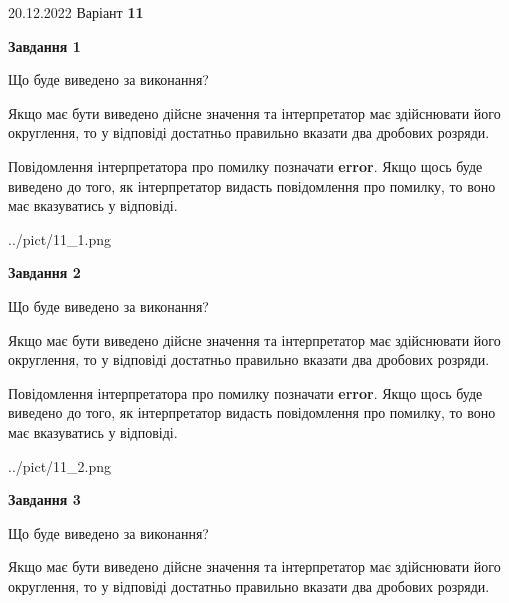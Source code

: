 \documentclass[12pt, ukrainian]{article}
\begin{document}
{20.12.2022 Варіант \No \textbf { 11 }\par}
{
\begin {Large}

{\begin {center}\textbf{Завдання 1}\end {center}}\par
Що буде виведено за виконання? \par

Якщо має бути виведено дійсне значення та інтерпретатор має здійснювати його округлення, 
то у відповіді достатньо правильно вказати два дробових розряди.

Повідомлення інтерпретатора про помилку позначати \textbf{error}.
Якщо щось буде виведено до того, як інтерпретатор видасть повідомлення про помилку, 
то воно має вказуватись у відповіді. \par

\begin{center}
	{../pict/11_1.png}
\end{center}
\newpage

{\begin {center}\textbf{Завдання 2}\end {center}}\par
Що буде виведено за виконання? \par

Якщо має бути виведено дійсне значення та інтерпретатор має здійснювати його округлення, 
то у відповіді достатньо правильно вказати два дробових розряди.

Повідомлення інтерпретатора про помилку позначати \textbf{error}.
Якщо щось буде виведено до того, як інтерпретатор видасть повідомлення про помилку, 
то воно має вказуватись у відповіді. \par

\begin{center}
	{../pict/11_2.png}
\end{center}
\newpage

{\begin {center}\textbf{Завдання 3}\end {center}}\par
Що буде виведено за виконання? \par

Якщо має бути виведено дійсне значення та інтерпретатор має здійснювати його округлення, 
то у відповіді достатньо правильно вказати два дробових розряди.


\end{Large}}
\end{document}

